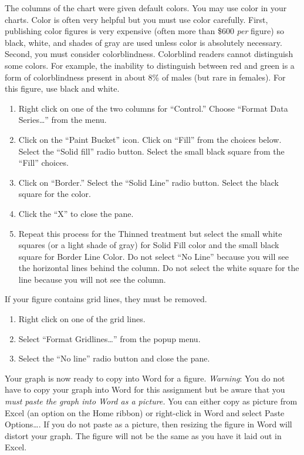 \documentclass[12pt, hidelinks]{exam}
\begin{document}
The columns of the chart were given default colors. You may use color in your charts. Color is often very helpful but you must use color carefully. First, publishing color figures is very expensive (often more than \$600 \emph{per} figure) so black, white, and shades of gray are used unless color is absolutely necessary. Second, you must consider colorblindness. Colorblind readers cannot distinguish some colors. For example, the inability to distinguish between red and green is a form of colorblindness present in about 8\% of males (but rare in females). For this figure, use black and white.

\begin{enumerate}[resume]
	\item Right click on one of the two columns for “Control.” Choose “Format Data Series…” from the menu.

	\item Click on the “Paint Bucket” icon. Click on “Fill” from the choices below. Select the “Solid fill” radio button. Select the small black square from the “Fill” choices.

	\item Click on “Border.” Select the “Solid Line” radio button. Select the black square for the color.

	\item Click the “X” to close the pane.

	\item Repeat this process for the Thinned treatment but select the small white squares (or a light shade of gray) for Solid Fill color  and the small black square for Border Line Color. Do not select “No Line” because you will see the horizontal lines behind the column. Do not select the white square for the line because you will not see the column.
\end{enumerate}

If your figure contains grid lines, they must be removed.

\begin{enumerate}[resume]
	\item Right click on one of the grid lines. 
	
	\item Select “Format Gridlines…” from the popup menu. 
	
	\item Select the “No line” radio button and close the pane.
\end{enumerate}

Your graph is now ready to copy into Word for a figure. \emph{Warning}: You do not have to copy your graph into Word for this assignment but be aware that you \emph{must paste the graph into Word as a picture.} You can either copy as picture from Excel (an option on the Home ribbon) or right-click in Word and select Paste Options…. If you do not paste as a picture, then resizing the figure in Word will distort your graph. The figure will not be the same as you have it laid out in Excel.
\end{document}
